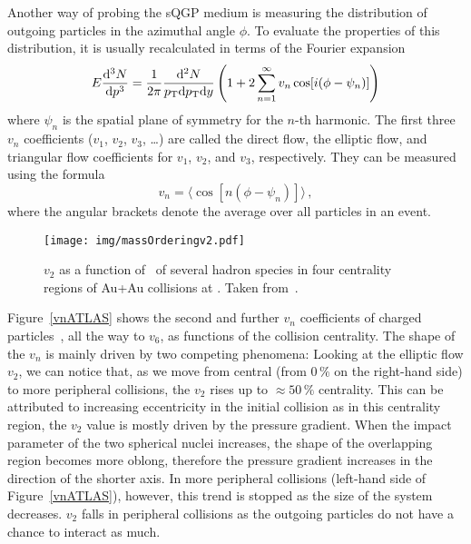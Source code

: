 Another way of probing the sQGP medium is measuring the distribution of outgoing particles in the azimuthal angle $\phi$\@. To evaluate the properties of this distribution, it is usually recalculated in terms of the Fourier expansion
\begin{equation}
E\frac{\mathrm{d}^3 N}{ \mathrm{d} p^3} = \frac{1}{2\pi}\frac{\mathrm{d}^2 N}{{p_{\mathrm{T}}} \mathrm{d} {p_{\mathrm{T}}} \mathrm{d} y} \left(1 + 2\sum_{n=1}^\infty v_n \cos[i(\phi - \psi_n)] \right)
\end{equation}
where $\psi_n$ is the spatial plane of symmetry for the $n$-th harmonic. The first three $v_n$ coefficients ($v_1$, $v_2$, $v_3$, \dots) are called the direct flow, the elliptic flow, and triangular flow coefficients for $v_1$, $v_2$, and $v_3$, respectively. They can be measured using the formula
\begin{equation}
v_n = \langle \cos[n(\phi - \psi_n)] \rangle\,,
\end{equation}
where the angular brackets denote the average over all particles in an event.



\begin{figure}[!htb]
\centering
\texttt{[image: img/massOrderingv2.pdf]}
\caption[$v_2$ as a function of \pt\ of several hadron species in four centrality regions of Au+Au collisions.]{\label{massOrdering}$v_2$ as a function of \pt\ of several hadron species in four centrality regions of Au+Au collisions at \snnFull\@. Taken from~\cite{StrangeAndChargedv2paper}.}

\end{figure}
Figure~\ref{vnATLAS} shows the second and further $v_n$ coefficients of charged particles~\cite{vnATLAS}, all the way to $v_6$, as functions of the collision centrality\@. The shape of the $v_n$ is mainly driven by two competing phenomena: Looking at the elliptic flow $v_2$, we can notice that, as we move from central (from 0$\,\%$ on the right-hand side) to more peripheral collisions, the $v_2$ rises up to $\approx50\,\%$ centrality. This can be attributed to increasing eccentricity in the initial collision as in this centrality region, the $v_2$ value is mostly driven by the pressure gradient. When the impact parameter of the two spherical nuclei increases, the shape of the overlapping region becomes more oblong, therefore the pressure gradient increases in the direction of the shorter axis. In more peripheral collisions (left-hand side of Figure~\ref{vnATLAS}), however, this trend is stopped as the size of the system decreases. $v_2$ falls in peripheral collisions as the outgoing particles do not have a chance to interact as much.

